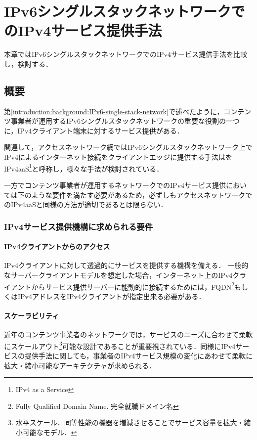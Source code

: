 \chapter{IPv6シングルスタックネットワークでのIPv4サービス提供手法}
\label{related}
本章ではIPv6シングルスタックネットワークでのIPv4サービス提供手法を比較し，検討する．


\section{概要}
\label{related:abstract}


第\ref{introduction:background:IPv6-single-stack-network}で述べたように，コンテンツ事業者が運用するIPv6シングルスタックネットワークの重要な役割の一つに，IPv4クライアント端末に対するサービス提供がある．

関連して，アクセスネットワーク網ではIPv6シングルスタックネットワーク上でIPv4によるインターネット接続をクライアントエッジに提供する手法はをIPv4aaS\footnote{IPv4 as a Service}と呼称し，様々な手法が検討されている\cite{RFC8585}．

一方でコンテンツ事業者が運用するネットワークでのIPv4サービス提供においては下のような要件を満たす必要があるため，必ずしもアクセスネットワークでのIPv4aaSと同様の方法が適切であるとは限らない．

\subsection{IPv4サービス提供機構に求められる要件}
\label{related:abstract:requirements}

\subsubsection{IPv4クライアントからのアクセス}
IPv4クライアントに対して透過的にサービスを提供する機構を備える．
一般的なサーバークライアントモデルを想定した場合，インターネット上のIPv4クライアントからサービス提供サーバーに能動的に接続するためには，FQDN\footnote{Fully Qualified Domain Name. 完全就職ドメイン名}もしくはIPv4アドレスをIPv4クライアントが指定出来る必要がある．


\subsubsection{スケーラビリティ}
近年のコンテンツ事業者のネットワークでは，サービスのニーズに合わせて柔軟にスケールアウト\footnote{水平スケール．同等性能の機器を増減させることでサービス容量を拡大・縮小可能なモデル．}可能な設計であることが重要視されている\cite{5550998}．同様にIPv4サービスの提供手法に関しても，事業者のIPv4サービス規模の変化にあわせて柔軟に拡大・縮小可能なアーキテクチャが求められる．

